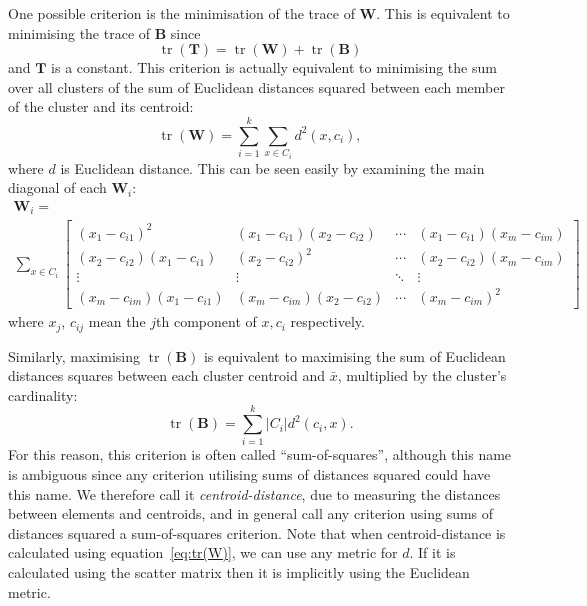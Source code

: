 \documentclass[a4paper]{report}
\DeclareMathOperator*{\tr}{tr}
\begin{document}
One possible criterion is the minimisation of the trace of $\mathbf{W}$.  This
is equivalent to minimising the trace of $\mathbf{B}$ since
\begin{equation*}
  \tr(\mathbf{T}) = \tr(\mathbf{W}) + \tr(\mathbf{B})
\end{equation*}
and $\mathbf{T}$ is a constant.  This criterion is actually equivalent to
minimising the sum over all clusters of the sum of Euclidean distances squared
between each member of the cluster and its centroid:
\begin{equation}
  \label{eq:tr(W)}
  \tr(\mathbf{W}) = \sum_{i=1}^{k} \sum_{x \in C_i} d^2(x,c_i),
\end{equation}
where $d$ is Euclidean distance.  This can be seen easily by examining the
main diagonal of each $\mathbf{W}_i$:
\begin{multline*}
  \mathbf{W}_i = \\
  \sum_{x \in C_i}
  \begin{bmatrix}
    (x_1-c_{i1})^2 & (x_1-c_{i1})(x_2-c_{i2}) & \cdots &
    (x_1-c_{i1})(x_m-c_{im}) \\
    (x_2-c_{i2})(x_1-c_{i1}) & (x_2-c_{i2})^2 & \cdots &
    (x_2-c_{i2})(x_m-c_{im}) \\
    \vdots & \vdots & \ddots & \vdots \\
    (x_m-c_{im})(x_1-c_{i1}) & (x_m-c_{im})(x_2-c_{i2}) & \cdots &
    (x_m-c_{im})^2
  \end{bmatrix}
\end{multline*}
where $x_j$, $c_{ij}$ mean the $j$th component of $x,c_{i}$ respectively.

Similarly, maximising $\tr(\mathbf{B})$ is equivalent to maximising the sum of
Euclidean distances squares between each cluster centroid and $\bar{x}$,
multiplied by the cluster's cardinality:
\begin{equation}
  \label{eq:tr(B)}
  \tr(\mathbf{B}) = \sum_{i=1}^{k} |C_i| d^2(c_i,x).
\end{equation}
For this reason, this criterion is often called ``sum-of-squares'', although
this name is ambiguous since any criterion utilising sums of distances squared
could have this name.  We therefore call it \textit{centroid-distance}, due to
measuring the distances between elements and centroids, and in general call
any criterion using sums of distances squared a sum-of-squares criterion.
Note that when centroid-distance is calculated using
equation~\eqref{eq:tr(W)}, we can use any metric for $d$.  If it is calculated
using the scatter matrix then it is implicitly using the Euclidean metric.
\end{document}
